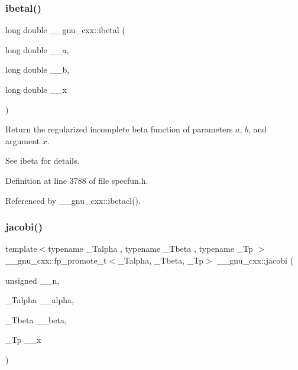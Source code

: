 \subsubsection{\texorpdfstring{ibetal()}{ibetal()}}
{\footnotesize\ttfamily long double \+\_\+\+\_\+gnu\+\_\+cxx\+::ibetal (\begin{DoxyParamCaption}\item[{long double}]{\+\_\+\+\_\+a,  }\item[{long double}]{\+\_\+\+\_\+b,  }\item[{long double}]{\+\_\+\+\_\+x }\end{DoxyParamCaption})\hspace{0.3cm}{\ttfamily [inline]}}

Return the regularized incomplete beta function of parameters $ a $, $ b $, and argument $ x $.

See ibeta for details. 

Definition at line 3788 of file specfun.\+h.



Referenced by \+\_\+\+\_\+gnu\+\_\+cxx\+::ibetacl().

\mbox{\label{group__gnu__math__spec__func_gad54f6601748324d268532138eb38ca33}} 
\subsubsection{\texorpdfstring{jacobi()}{jacobi()}}
{\footnotesize\ttfamily template$<$typename \+\_\+\+Talpha , typename \+\_\+\+Tbeta , typename \+\_\+\+Tp $>$ \\
\+\_\+\+\_\+gnu\+\_\+cxx\+::fp\+\_\+promote\+\_\+t$<$\+\_\+\+Talpha, \+\_\+\+Tbeta, \+\_\+\+Tp$>$ \+\_\+\+\_\+gnu\+\_\+cxx\+::jacobi (\begin{DoxyParamCaption}\item[{unsigned}]{\+\_\+\+\_\+n,  }\item[{\+\_\+\+Talpha}]{\+\_\+\+\_\+alpha,  }\item[{\+\_\+\+Tbeta}]{\+\_\+\+\_\+beta,  }\item[{\+\_\+\+Tp}]{\+\_\+\+\_\+x }\end{DoxyParamCaption})\hspace{0.3cm}{\ttfamily [inline]}}

